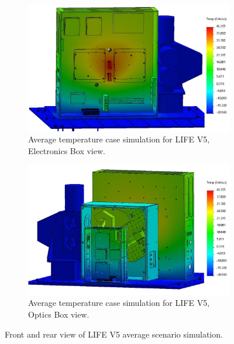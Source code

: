 \begin{figure}
    \centering
    \begin{subfigure}[h]{0.9\textwidth}
        \centering
        \includegraphics[width=\textwidth]{chap3_images/LIFE_V5_initial_images/Iteration_2_ebox_no_labels_FIXED.png}
        \caption{Average temperature case simulation for LIFE V5, Electronics Box view.}
        \label{fig:LIFE_V5_TA_AVG_EBOX}
    \end{subfigure}
    \begin{subfigure}[h]{0.9\textwidth}
        \centering
        \includegraphics[width=\textwidth]{chap3_images/LIFE_V5_initial_images/Iteration_2_no_labels_FIXED.png}
        \caption{Average temperature case simulation for LIFE V5, Optics Box view.}
        \label{fig:LIFE_V4_TA_AVG_OBOX}
    \end{subfigure}
    \caption{Front and rear view of LIFE V5 average scenario simulation.}
    \label{LIFE_V5_Prelim_TA_AVG}
\end{figure}

